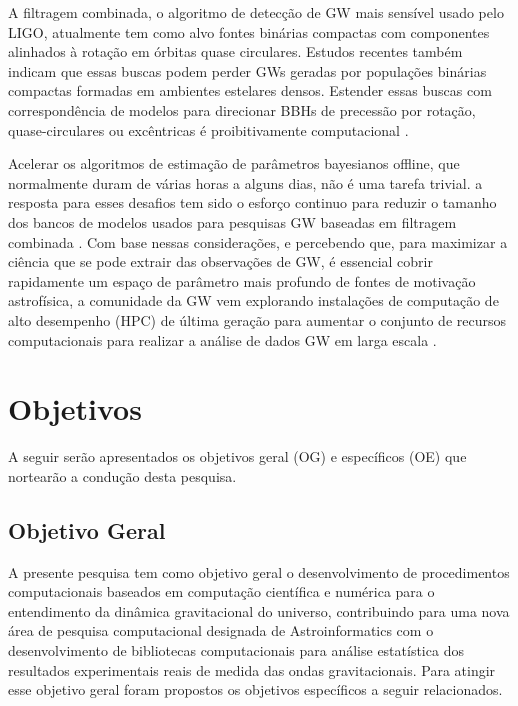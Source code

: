 A filtragem combinada, o algoritmo de detecção de GW mais sensível usado pelo LIGO, atualmente tem como alvo fontes binárias compactas com componentes alinhados à rotação em órbitas quase circulares.  Estudos recentes também indicam que essas buscas podem perder GWs geradas por populações binárias compactas formadas em ambientes estelares densos. Estender essas buscas com correspondência de modelos para direcionar BBHs de precessão por rotação, quase-circulares ou excêntricas é proibitivamente computacional \cite{george2018deep}.

Acelerar os algoritmos de estimação de parâmetros bayesianos offline, que normalmente duram de várias horas a alguns dias, não é uma tarefa trivial. a resposta para esses desafios tem sido o esforço continuo para reduzir o tamanho dos bancos de modelos usados para pesquisas GW baseadas em filtragem combinada \cite{indik2017reducing}. Com base nessas considerações, e percebendo que, para maximizar a ciência que se pode extrair das observações de GW, é essencial cobrir rapidamente um espaço de parâmetro mais profundo de fontes de motivação astrofísica, a comunidade da GW vem explorando instalações de computação de alto desempenho (HPC) de última geração para aumentar o conjunto de recursos computacionais para realizar a análise de dados GW em larga escala \cite{huerta2017boss,weitzel2017data}.


\section{Objetivos}
A seguir serão apresentados os objetivos geral (OG) e específicos (OE) que nortearão a condução desta pesquisa.

\subsection{Objetivo Geral}
A presente pesquisa tem como objetivo geral o desenvolvimento de procedimentos computacionais baseados em computação científica e numérica para o entendimento da dinâmica gravitacional do universo, contribuindo para uma nova área de pesquisa computacional designada de Astroinformatics com o desenvolvimento de bibliotecas computacionais para análise estatística dos resultados experimentais reais de medida das ondas gravitacionais. Para atingir esse objetivo geral foram propostos os objetivos específicos a seguir relacionados.
